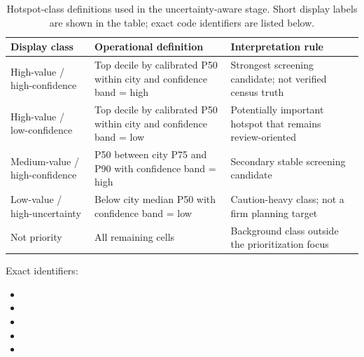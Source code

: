 \begin{table}[H]
\centering
\footnotesize
\setlength{\tabcolsep}{3.5pt}
\renewcommand{\arraystretch}{1.15}
\caption{Hotspot-class definitions used in the uncertainty-aware stage. Short display labels are shown in the table; exact code identifiers are listed below.}
\label{tab:s7-hotspot-class-definitions}
\begin{tabularx}{\textwidth}{L{3.25cm} Y Y}
\toprule
Display class & Operational definition & Interpretation rule \\
\midrule
High-value / high-confidence & Top decile by calibrated P50 within city and confidence band = high & Strongest screening candidate; not verified census truth \\
High-value / low-confidence & Top decile by calibrated P50 within city and confidence band = low & Potentially important hotspot that remains review-oriented \\
Medium-value / high-confidence & P50 between city P75 and P90 with confidence band = high & Secondary stable screening candidate \\
Low-value / high-uncertainty & Below city median P50 with confidence band = low & Caution-heavy class; not a firm planning target \\
Not priority & All remaining cells & Background class outside the prioritization focus \\
\bottomrule
\end{tabularx}
\par\medskip
\noindent\footnotesize Exact identifiers:
\begin{itemize}\setlength{\itemsep}{0pt}\setlength{\topsep}{0pt}
\item {}
\item {}
\item {}
\item {}
\item {}
\end{itemize}
\end{table}
